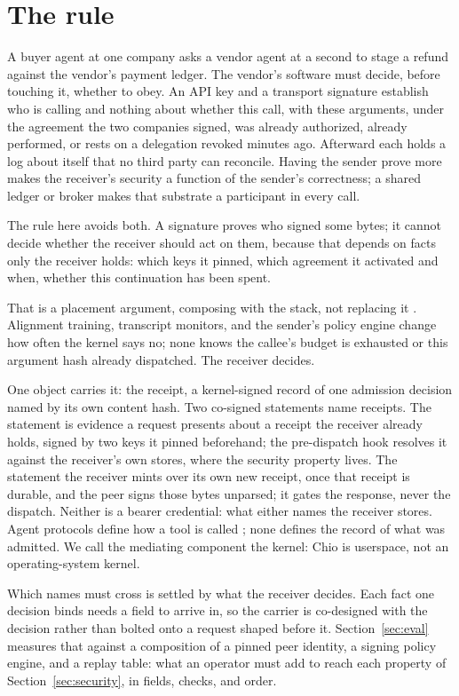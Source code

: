 \section{The rule}

A buyer agent at one company asks a vendor agent at a second to stage a refund
against the vendor's payment ledger. The vendor's software must decide, before
touching it, whether to obey. An API key and a transport signature
establish who is calling and nothing about whether this call, with these
arguments, under the agreement the two companies signed, was already authorized,
already performed, or rests on a delegation revoked minutes ago. Afterward
each holds a log about itself that no third party can reconcile. Having the
sender prove more makes the receiver's security a function of the sender's
correctness; a shared ledger or broker makes that substrate a participant in
every call.

The rule here avoids both.  A signature proves who signed some bytes; it
cannot decide whether the receiver should act on them, because that depends on
facts only the receiver holds: which keys it pinned, which agreement it
activated and when, whether this continuation has been spent.

That is a placement argument, composing with the stack, not replacing it
\cite{saltzer1984}. Alignment training, transcript monitors, and the sender's
policy engine change how often the kernel says no; none knows the callee's
budget is exhausted or this argument hash already dispatched. The receiver
decides.

One object carries it: the receipt, a kernel-signed record of one admission
decision named by its own content hash. Two co-signed statements name receipts.
The  statement is evidence a request presents about a receipt the
receiver already holds, signed by two keys it pinned beforehand; the
pre-dispatch hook resolves it against the receiver's own stores, where the
security property lives. The  statement the receiver mints
over its own new receipt, once that receipt is durable, and the peer signs
those bytes unparsed; it gates the response, never the dispatch. Neither is a bearer credential: what either
names the receiver stores. Agent protocols define how a tool is called
\cite{mcp,a2a}; none defines the record of what was admitted. We call the
mediating component the kernel: Chio is userspace, not an operating-system
kernel.

Which names must cross is settled by what the receiver decides. Each fact one
decision binds needs a field to arrive in, so the carrier is co-designed with
the decision rather than bolted onto a request shaped before it.
Section~\ref{sec:eval} measures that against a composition of a pinned peer
identity, a signing policy engine, and a replay table: what an operator must add
to reach each property of Section~\ref{sec:security}, in fields, checks, and
order.
